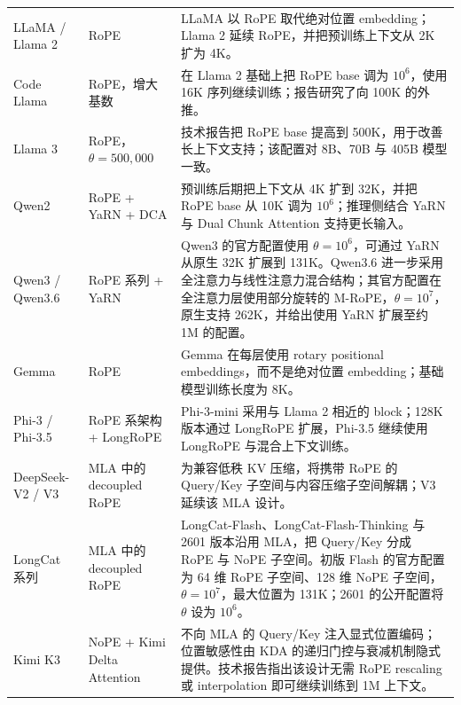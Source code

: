 \documentclass[UTF8,fontset=none,a4paper,10pt]{ctexart}
\begin{document}
\begin{longtable}{@{}p{2.7cm}p{3.6cm}p{8.0cm}@{}}
LLaMA / Llama 2 & RoPE & LLaMA 以 RoPE 取代绝对位置 embedding；Llama 2 延续 RoPE，并把预训练上下文从 2K 扩为 4K\cite{zh:touvron2023llama,zh:touvron2023llama2}。\\

Code Llama & RoPE，增大基数 & 在 Llama 2 基础上把 RoPE base 调为 $10^6$，使用 16K 序列继续训练；报告研究了向 100K 的外推\cite{zh:roziere2023codellama}。\\

Llama 3 & RoPE，$\theta=500{,}000$ & 技术报告把 RoPE base 提高到 500K，用于改善长上下文支持；该配置对 8B、70B 与 405B 模型一致\cite{zh:dubey2024llama3}。\\

Qwen2 & RoPE + YaRN + DCA & 预训练后期把上下文从 4K 扩到 32K，并把 RoPE base 从 10K 调为 $10^6$；推理侧结合 YaRN 与 Dual Chunk Attention 支持更长输入\cite{zh:yang2024qwen2}。\\

Qwen3 / Qwen3.6 & RoPE 系列 + YaRN & Qwen3 的官方配置使用 $\theta=10^6$，可通过 YaRN 从原生 32K 扩展到 131K\cite{zh:yang2025qwen3}。Qwen3.6 进一步采用全注意力与线性注意力混合结构；其官方配置在全注意力层使用部分旋转的 M-RoPE，$\theta=10^7$，原生支持 262K，并给出使用 YaRN 扩展至约 1M 的配置\cite{zh:qwen36config}。\\

Gemma & RoPE & Gemma 在每层使用 rotary positional embeddings，而不是绝对位置 embedding；基础模型训练长度为 8K\cite{zh:gemmateam2024}。\\

Phi-3 / Phi-3.5 & RoPE 系架构 + LongRoPE & Phi-3-mini 采用与 Llama 2 相近的 block；128K 版本通过 LongRoPE 扩展，Phi-3.5 继续使用 LongRoPE 与混合上下文训练\cite{zh:abdin2024phi3}。\\

DeepSeek-V2 / V3 & MLA 中的 decoupled RoPE & 为兼容低秩 KV 压缩，将携带 RoPE 的 Query/Key 子空间与内容压缩子空间解耦；V3 延续该 MLA 设计\cite{zh:deepseek2024v2,zh:deepseek2024v3}。\\

LongCat 系列 & MLA 中的 decoupled RoPE & LongCat-Flash、LongCat-Flash-Thinking 与 2601 版本沿用 MLA，把 Query/Key 分成 RoPE 与 NoPE 子空间。初版 Flash 的官方配置为 64 维 RoPE 子空间、128 维 NoPE 子空间，$\theta=10^7$，最大位置为 131K；2601 的公开配置将 $\theta$ 设为 $10^6$\cite{zh:longcatflash,zh:longcatthinking2601,zh:longcatconfigs}。\\

Kimi K3 & NoPE + Kimi Delta Attention & 不向 MLA 的 Query/Key 注入显式位置编码；位置敏感性由 KDA 的递归门控与衰减机制隐式提供。技术报告指出该设计无需 RoPE rescaling 或 interpolation 即可继续训练到 1M 上下文\cite{zh:kimik3}。\\


\end{longtable}
\end{document}
